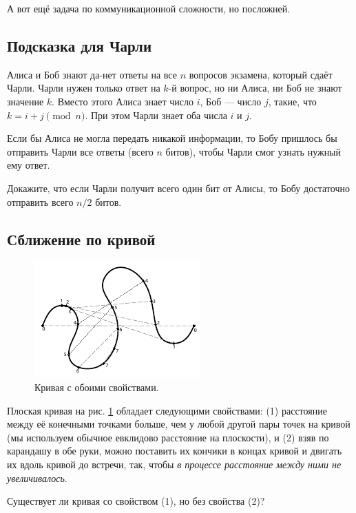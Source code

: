 \medskip

А вот ещё задача по коммуникационной сложности, но посложней.

\subsection*{Подсказка для Чарли}

Алиса и Боб знают да-нет ответы на все $n$ вопросов экзамена, который сдаёт Чарли.
Чарли нужен только ответ на $k$-й вопрос, но ни Алиса, ни Боб не знают значение $k$.
Вместо этого Алиса знает число $i$, Боб --- число $j$, такие, что $k = i + j \pmod n$.
При этом Чарли знает оба числа $i$ и $j$.

Если бы Алиса не могла передать никакой информации,
то Бобу пришлось бы отправить Чарли все ответы (всего $n$ битов), чтобы Чарли смог узнать нужный ему ответ.

Докажите, что если Чарли получит всего один бит от Алисы, то Бобу достаточно отправить всего $n/2$ битов.

\subsection*{Сближение по кривой}

\begin{figure}[htb!]
\centering
\includegraphics[scale=1]{pics/s-curve}
\caption{Кривая с обоими свойствами.}
\label{pic:s-curv}
\end{figure}

Плоская кривая на рис. \ref{pic:s-curv} обладает следующими свойствами:
(1) расстояние между её конечными точками больше, чем у любой другой пары точек на кривой (мы используем обычное евклидово расстояние на плоскости),
и
(2) взяв по карандашу в обе руки, можно поставить их кончики в концах кривой и двигать их вдоль кривой до встречи, так, чтобы \emph{в процессе расстояние между ними не увеличивалось}.

Существует ли кривая со свойством (1), но без свойства (2)?


